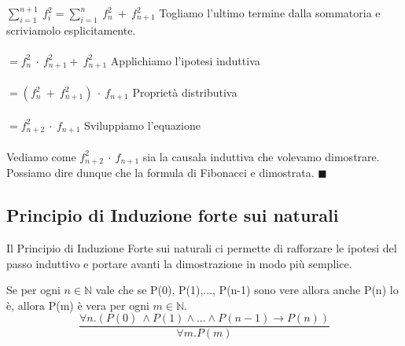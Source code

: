 \begin{example}
\begin{demostration}
        $\sum_{i=1}^{n+1}\:f_i^{2} = \sum_{i=1}^{n}\:f_n^2 \: + \: f_{n+1}^2$ \hspace{.3cm} Togliamo l'ultimo termine dalla sommatoria e scriviamolo esplicitamente. \\ \\
        $= f_n^2 \: \cdot \: f_{n+1}^2 + \: f_{n+1}^2$ \hspace{.3cm} Applichiamo l'ipotesi induttiva \\ \\
        $= (f_n^2 \: + \: f_{n+1}^2) \: \cdot \: f_{n+1}$  \hspace{.3cm} Proprietà distributiva\\ \\
        $= f_{n+2}^2 \: \cdot \: f_{n+1}$  \hspace{.3cm} Sviluppiamo l'equazione \\\\
        Vediamo come $f_{n+2}^2 \: \cdot \: f_{n+1}$ sia la causala induttiva che volevamo dimostrare. Possiamo dire dunque che la formula di Fibonacci e dimostrata. $\blacksquare$
    \end{demostration}
\end{example}

\subsection{Principio di Induzione forte sui naturali}
Il Principio di Induzione Forte sui naturali ci permette di rafforzare le ipotesi del passo induttivo e portare avanti la dimostrazione in modo più semplice.
\begin{definition}
    Se per ogni $n \in \mathbb{N}$ vale che se P(0), P(1),..., P(n-1) sono vere allora anche P(n) lo è, allora P(m) è vera per ogni $m \in \mathbb{N}$.
    \begin{equation}
        \frac{\forall n . (P(0) \: \land P(1) \land ... \land P(n-1) \rightarrow P(n))}{\forall m . P(m)}
    \end{equation}
\end{definition}